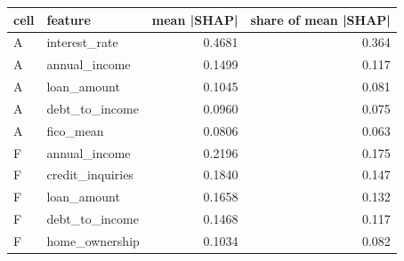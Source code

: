 \begin{tabular}{llrr}
\toprule
cell & feature & mean |SHAP| & share of mean |SHAP| \\
\midrule
A & interest\_rate & 0.4681 & 0.364 \\
A & annual\_income & 0.1499 & 0.117 \\
A & loan\_amount & 0.1045 & 0.081 \\
A & debt\_to\_income & 0.0960 & 0.075 \\
A & fico\_mean & 0.0806 & 0.063 \\
F & annual\_income & 0.2196 & 0.175 \\
F & credit\_inquiries & 0.1840 & 0.147 \\
F & loan\_amount & 0.1658 & 0.132 \\
F & debt\_to\_income & 0.1468 & 0.117 \\
F & home\_ownership & 0.1034 & 0.082 \\
\bottomrule
\end{tabular}
